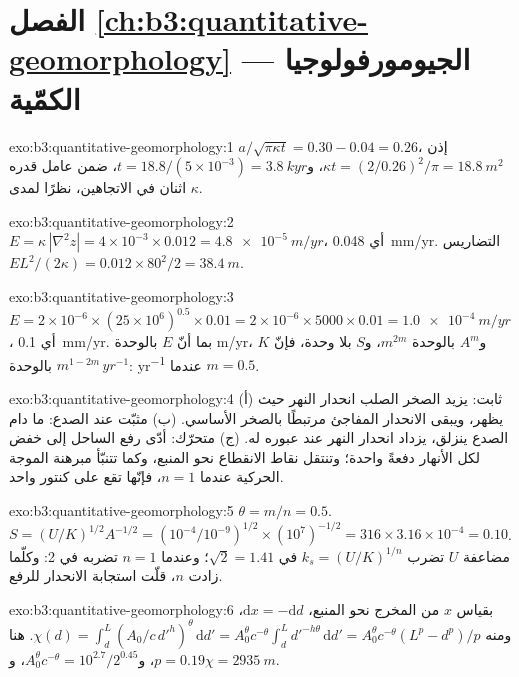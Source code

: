 \section*{الفصل \ref{ch:b3:quantitative-geomorphology} --- الجيومورفولوجيا الكمّية}

\begin{solution}{exo:b3:quantitative-geomorphology:1}
$a/\sqrt{\pi\kappa t} = 0.30 - 0.04 = 0.26$، إذن $\kappa t = (2/0.26)^2/\pi =
\qty{18.8}{m^2}$، و$t = 18.8/(5\times10^{-3}) = \qty{3.8}{kyr}$، ضمن
عامل قدره اثنان في الاتجاهين، نظرًا لمدى $\kappa$.
\end{solution}

\begin{solution}{exo:b3:quantitative-geomorphology:2}
$E = \kappa\,|\nabla^2 z| = 4\times10^{-3}\times0.012 =
\qty{4.8e-5}{m/yr}$، أي \qty{0.048}{mm/yr}. التضاريس $E L^2/(2\kappa) =
0.012\times80^2/2 = \qty{38.4}{m}$.
\end{solution}

\begin{solution}{exo:b3:quantitative-geomorphology:3}
$E = 2\times10^{-6}\times(25\times10^6)^{0.5}\times0.01 = 2\times10^{-6}
\times5000\times0.01 = \qty{1.0e-4}{m/yr}$، أي \qty{0.1}{mm/yr}. بما أنّ $E$
بالوحدة \unit{m/yr}، و$A^m$ بالوحدة $\unit{m}^{2m}$، و$S$ بلا وحدة، فإنّ $K$ بالوحدة
$\unit{m}^{1-2m}\,\unit{yr^{-1}}$: \unit{yr^{-1}} عندما $m = 0.5$.
\end{solution}

\begin{solution}{exo:b3:quantitative-geomorphology:4}
(أ) ثابت: يزيد الصخر الصلب انحدار النهر حيث يظهر، ويبقى الانحدار المفاجئ
مرتبطًا بالصخر الأساسي. (ب) مثبّت عند الصدع: ما دام الصدع ينزلق،
يزداد انحدار النهر عند عبوره له. (ج) متحرّك: أدّى رفع
الساحل إلى خفض  لكل الأنهار دفعةً واحدة؛ وتنتقل نقاط الانقطاع
نحو المنبع، وكما تتنبّأ مبرهنة الموجة الحركية عندما $n
= 1$، فإنّها تقع على كنتور واحد.
\end{solution}

\begin{solution}{exo:b3:quantitative-geomorphology:5}
$\theta = m/n = 0.5$. $S = (U/K)^{1/2}A^{-1/2} = (10^{-4}/10^{-9})^{1/2}
\times(10^7)^{-1/2} = 316\times3.16\times10^{-4} = 0.10$. مضاعفة $U$
تضرب $k_s = (U/K)^{1/n}$ في $\sqrt2 = 1.41$؛ وعندما $n = 1$ تضربه في 2:
وكلّما زادت $n$، قلّت استجابة الانحدار للرفع.
\end{solution}

\begin{solution}{exo:b3:quantitative-geomorphology:6}
بقياس $x$ من المخرج نحو المنبع، $\mathrm{d}x = -\mathrm{d}d$، ومنه $\chi(d)
= \int_d^L (A_0/c\,d'^{h})^{\theta}\,\mathrm{d}d' = A_0^{\theta} c^{-\theta}
\int_d^L d'^{-h\theta}\,\mathrm{d}d' = A_0^{\theta}c^{-\theta}(L^p -
d^p)/p$. هنا $p = 0.19$، و$A_0^{\theta}c^{-\theta} = 10^{2.7}/2^{0.45}$،
و$\chi = \qty{2935}{m}$.
\end{solution}

